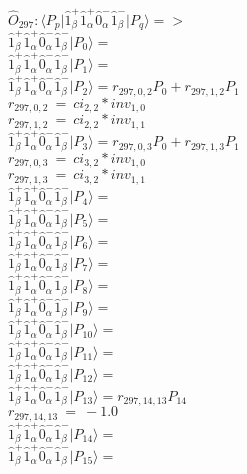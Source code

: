 \documentclass[14pt]{article}
\begin{document}
    $\hat{O}_{297}:  \langle{P_p}\vert \hat{1}_{\beta}^{+}\hat{1}_{\alpha}^{+}\hat{0}_{\alpha}^{-}\hat{1}_{\beta}^{-} \vert{P_q}\rangle => $ \\ 
    $ \hat{1}_{\beta}^{+}\hat{1}_{\alpha}^{+}\hat{0}_{\alpha}^{-}\hat{1}_{\beta}^{-} \vert{P_{0}}\rangle =  $ \\ 
    $ \hat{1}_{\beta}^{+}\hat{1}_{\alpha}^{+}\hat{0}_{\alpha}^{-}\hat{1}_{\beta}^{-} \vert{P_{1}}\rangle =  $ \\ 
    $ \hat{1}_{\beta}^{+}\hat{1}_{\alpha}^{+}\hat{0}_{\alpha}^{-}\hat{1}_{\beta}^{-} \vert{P_{2}}\rangle = {r}_{297,0,2}P_{0}+{r}_{297,1,2}P_{1} $ \\ 
    ${r}_{297,0,2}\ =\ {ci}_{2,2}*{inv}_{1,0} $ \\ 
    ${r}_{297,1,2}\ =\ {ci}_{2,2}*{inv}_{1,1} $ \\ 
    $ \hat{1}_{\beta}^{+}\hat{1}_{\alpha}^{+}\hat{0}_{\alpha}^{-}\hat{1}_{\beta}^{-} \vert{P_{3}}\rangle = {r}_{297,0,3}P_{0}+{r}_{297,1,3}P_{1} $ \\ 
    ${r}_{297,0,3}\ =\ {ci}_{3,2}*{inv}_{1,0} $ \\ 
    ${r}_{297,1,3}\ =\ {ci}_{3,2}*{inv}_{1,1} $ \\ 
    $ \hat{1}_{\beta}^{+}\hat{1}_{\alpha}^{+}\hat{0}_{\alpha}^{-}\hat{1}_{\beta}^{-} \vert{P_{4}}\rangle =  $ \\ 
    $ \hat{1}_{\beta}^{+}\hat{1}_{\alpha}^{+}\hat{0}_{\alpha}^{-}\hat{1}_{\beta}^{-} \vert{P_{5}}\rangle =  $ \\ 
    $ \hat{1}_{\beta}^{+}\hat{1}_{\alpha}^{+}\hat{0}_{\alpha}^{-}\hat{1}_{\beta}^{-} \vert{P_{6}}\rangle =  $ \\ 
    $ \hat{1}_{\beta}^{+}\hat{1}_{\alpha}^{+}\hat{0}_{\alpha}^{-}\hat{1}_{\beta}^{-} \vert{P_{7}}\rangle =  $ \\ 
    $ \hat{1}_{\beta}^{+}\hat{1}_{\alpha}^{+}\hat{0}_{\alpha}^{-}\hat{1}_{\beta}^{-} \vert{P_{8}}\rangle =  $ \\ 
    $ \hat{1}_{\beta}^{+}\hat{1}_{\alpha}^{+}\hat{0}_{\alpha}^{-}\hat{1}_{\beta}^{-} \vert{P_{9}}\rangle =  $ \\ 
    $ \hat{1}_{\beta}^{+}\hat{1}_{\alpha}^{+}\hat{0}_{\alpha}^{-}\hat{1}_{\beta}^{-} \vert{P_{10}}\rangle =  $ \\ 
    $ \hat{1}_{\beta}^{+}\hat{1}_{\alpha}^{+}\hat{0}_{\alpha}^{-}\hat{1}_{\beta}^{-} \vert{P_{11}}\rangle =  $ \\ 
    $ \hat{1}_{\beta}^{+}\hat{1}_{\alpha}^{+}\hat{0}_{\alpha}^{-}\hat{1}_{\beta}^{-} \vert{P_{12}}\rangle =  $ \\ 
    $ \hat{1}_{\beta}^{+}\hat{1}_{\alpha}^{+}\hat{0}_{\alpha}^{-}\hat{1}_{\beta}^{-} \vert{P_{13}}\rangle = {r}_{297,14,13}P_{14} $ \\ 
    ${r}_{297,14,13}\ =\ -1.0 $ \\ 
    $ \hat{1}_{\beta}^{+}\hat{1}_{\alpha}^{+}\hat{0}_{\alpha}^{-}\hat{1}_{\beta}^{-} \vert{P_{14}}\rangle =  $ \\ 
    $ \hat{1}_{\beta}^{+}\hat{1}_{\alpha}^{+}\hat{0}_{\alpha}^{-}\hat{1}_{\beta}^{-} \vert{P_{15}}\rangle =  $ \\ 
    
\end{document}
